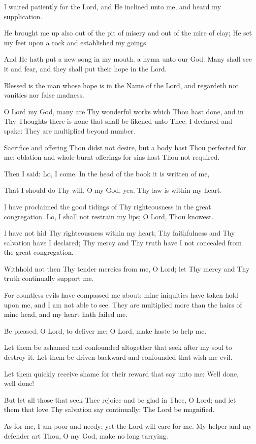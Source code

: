 I waited patiently for the Lord, and He inclined unto me, and heard my supplication.

He brought me up also out of the pit of misery and out of the mire of clay; He set my feet upon a rock and established my goings.

And He hath put a new song in my mouth, a hymn unto our God. Many shall see it and fear, and they shall put their hope in the Lord.

Blessed is the man whose hope is in the Name of the Lord, and regardeth not vanities nor false madness.

O Lord my God, many are Thy wonderful works which Thou hast done, and in Thy Thoughts there is none that shall be likened unto Thee. I declared and spake: They are multiplied beyond number.

Sacrifice and offering Thou didst not desire, but a body hast Thou perfected for me; oblation and whole burnt offerings for sins hast Thou not required.

Then I said: Lo, I come. In the head of the book it is written of me,

That I should do Thy will, O my God; yea, Thy law is within my heart.

I have proclaimed the good tidings of Thy righteousness in the great congregation. Lo, I shall not restrain my lips; O Lord, Thou knowest.

I have not hid Thy righteousness within my heart; Thy faithfulness and Thy salvation have I declared; Thy mercy and Thy truth have I not concealed from the great congregation.

Withhold not then Thy tender mercies from me, O Lord; let Thy mercy and Thy truth continually support me.

For countless evils have compassed me about; mine iniquities have taken hold upon me, and I am not able to see. They are multiplied more than the hairs of mine head, and my heart hath failed me.

Be pleased, O Lord, to deliver me; O Lord, make haste to help me.

Let them be ashamed and confounded altogether that seek after my soul to destroy it. Let them be driven backward and confounded that wish me evil.

Let them quickly receive shame for their reward that say unto me: Well done, well done!

But let all those that seek Thee rejoice and be glad in Thee, O Lord; and let them that love Thy salvation say continually: The Lord be magnified.

As for me, I am poor and needy; yet the Lord will care for me. My helper and my defender art Thou, O my God, make no long tarrying.
